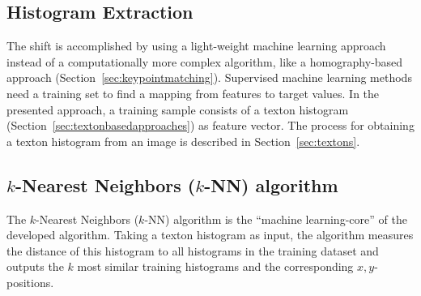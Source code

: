 \documentclass{report}
\begin{document}
\subsection{Histogram Extraction}
\label{sec:histogramextract}

The shift is accomplished by using a light-weight machine learning
approach instead of a computationally more complex algorithm, like a
homography-based approach
(Section~\ref{sec:keypointmatching}). Supervised machine learning
methods need a training set to find a mapping from features to target
values. In the presented approach, a training sample consists of a
texton histogram (Section~\ref{sec:textonbasedapproaches}) as feature
vector. The process for obtaining a texton histogram from an image is
described in Section~\ref{sec:textons}.

\subsection{$k$-Nearest Neighbors ($k$-NN) algorithm}
\label{sec:knn}

The $k$-Nearest Neighbors ($k$-NN) algorithm is the ``machine
learning-core'' of the developed algorithm. Taking a texton histogram
as input, the algorithm measures the distance of this histogram to all
histograms in the training dataset and outputs the $k$ most similar
training histograms and the corresponding $x,y$-positions.

\end{document}
